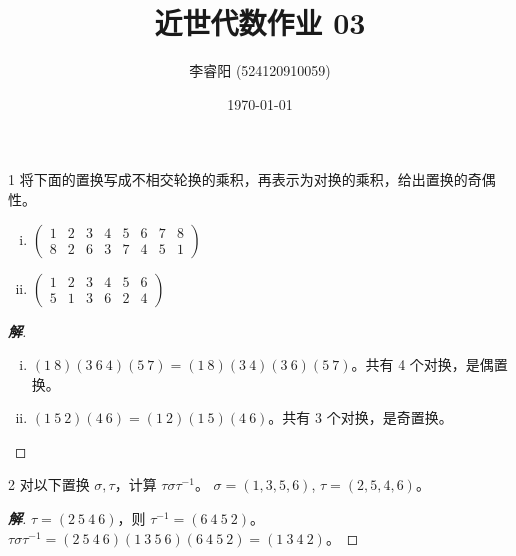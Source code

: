 \documentclass[12pt, a4paper]{article}
\title{近世代数作业 03}
\author{李睿阳 (524120910059)}
\date{\today}
\newenvironment{solution}{
    \begin{proof}[\textbf{解}]
}{
    \end{proof}
}
\begin{document}
\maketitle


\begin{problem}{1}
    将下面的置换写成不相交轮换的乘积，再表示为对换的乘积，给出置换的奇偶性。
    \begin{enumerate}[(i)]
        \item $\begin{pmatrix} 1 & 2 & 3 & 4 & 5 & 6 & 7 & 8 \\ 8 & 2 & 6 & 3 & 7 & 4 & 5 & 1 \end{pmatrix}$
        \item $\begin{pmatrix} 1 & 2 & 3 & 4 & 5 & 6 \\ 5 & 1 & 3 & 6 & 2 & 4 \end{pmatrix}$
    \end{enumerate}
\end{problem}
\begin{solution}
    \begin{enumerate}[(i)]
        \item $(1\ 8)(3\ 6\ 4)(5\ 7) = (1\ 8)(3\ 4)(3\ 6)(5\ 7)$。共有 4 个对换，是偶置换。
        \item $(1\ 5\ 2)(4\ 6) = (1\ 2)(1\ 5)(4\ 6)$。共有 3 个对换，是奇置换。
    \end{enumerate}
\end{solution}

\begin{problem}{2}
    对以下置换 $\sigma, \tau$，计算 $\tau\sigma\tau^{-1}$。
    $\sigma = (1, 3, 5, 6)$, $\tau = (2, 5, 4, 6)$。
\end{problem}
\begin{solution}
    $\tau = (2\ 5\ 4\ 6)$，则 $\tau^{-1} = (6\ 4\ 5\ 2)$。
    $\tau\sigma\tau^{-1} = (2\ 5\ 4\ 6)(1\ 3\ 5\ 6)(6\ 4\ 5\ 2) = (1\ 3\ 4\ 2)$。
\end{solution}
\end{document}
